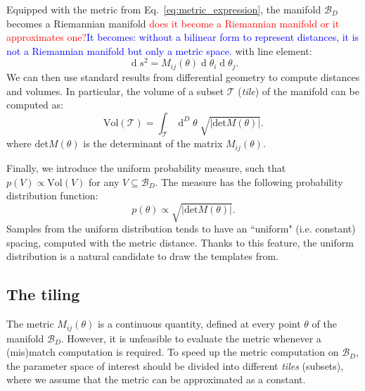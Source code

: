 \documentclass[twocolumn,showpacs,preprintnumbers,nofootinbib,prd,
superscriptaddress,10pt]{revtex4-2}
\renewcommand{\d}[1]{\ensuremath{\operatorname{d}\!{#1}}}
\newcommand{\dvol}[2]{\ensuremath{\operatorname{d}^{#2}\!{#1}}}
\begin{document}
Equipped with the metric from Eq.~\eqref{eq:metric_expression}, the manifold $\mathcal{B}_D$ becomes a Riemannian manifold
\textcolor{red}{does it become a Riemannian manifold or it approximates one?}\textcolor{blue}{It becomes: without a bilinear form to represent distances, it is not a Riemannian manifold but only a metric space.}
with line element:
\begin{equation}\label{eq:line_element}
	\d{s^2} = M_{ij}(\theta) \d{\theta_i} \d{\theta_j}.
\end{equation}
We can then use standard results from differential geometry to compute distances and volumes. In particular, the volume of a subset $\mathcal{T}$ ({\it tile}) of the manifold can be computed as:
\begin{equation}\label{eq:volume_tile}
	\text{Vol}(\mathcal{T}) = \int_\mathcal{T} \dvol{\theta}{D} \; \sqrt{| \text{det}M(\theta)|}.
\end{equation}
where $\text{det}M(\theta)$ is the determinant of the matrix $M_{ij}(\theta)$.

Finally, we introduce the uniform probability measure, such that $p(V) \propto \text{Vol}(V)$ for any $V\subseteq \mathcal{B}_D$. The measure has the following probability distribution function:
\begin{equation}\label{eq:pdf_uniform}
	p(\theta) \propto \sqrt{|\text{det}M(\theta)|}.
\end{equation}
Samples from the uniform distribution tends to have an ``uniform" (i.e. constant) spacing, computed with the metric distance. Thanks to this feature, the uniform distribution is a natural candidate to draw the templates from.

\subsection{The tiling} \label{sec:tiling}

The metric $M_{ij}(\theta)$ is a continuous quantity, defined at every point $\theta$ of the manifold $\mathcal{B}_D$.
However, it is unfeasible to evaluate the metric whenever a (mis)match computation is required.
To speed up the metric computation on $\mathcal{B}_D$, the parameter space of interest should be divided into different {\it tiles} (subsets), where we assume that the metric can be approximated as a constant.
\end{document}
